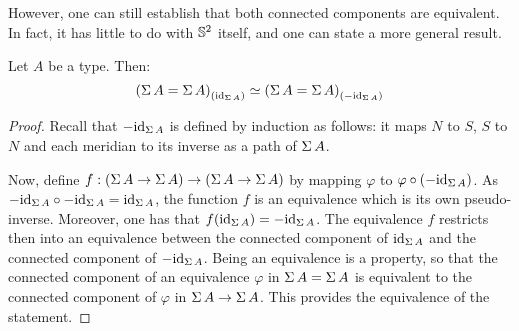 \documentclass[english,a4]{article}
\renewcommand{\ap}[1]{\left[{#1}\right]}
\begin{document}
However, one can still establish that both connected components are equivalent.
In fact, it has little to do with ${{\mathbb S^{2}}}$ itself, and one can state a more
general result.
\begin{proposition} \label{prop:equiv-susp-comp}
  Let $A$ be a type. Then:
  \begin{displaymath}
    {(\operatorname{\Sigma}A = \operatorname{\Sigma}A)}_{\left(\mathord{\mathrm{id}}_{\operatorname{\Sigma} A}\right)} \simeq {(\operatorname{\Sigma}A = \operatorname{\Sigma}A)}_{\left(-\mathord{\mathrm{id}}_{\operatorname{\Sigma} A}\right)}
  \end{displaymath}
  \label{prop:susp-components-are-equiv}
\end{proposition}
\begin{proof}
  Recall that $-\mathord{\mathrm{id}}_{\operatorname{\Sigma} A}$ is defined by induction as follows: it maps $N$
  to $S$, $S$ to $N$ and each meridian to its inverse as a path of $\operatorname{\Sigma} A$.

  Now, define $f:{({\operatorname{\Sigma} A} \to {\operatorname{\Sigma}A})} \to ({\operatorname{\Sigma} A} \to {\operatorname{\Sigma}A})$ by mapping
  $\varphi$ to $\varphi\circ(-\mathord{\mathrm{id}}_{\operatorname{\Sigma} A})$.
  As $-\mathord{\mathrm{id}}_{\operatorname{\Sigma} A}\circ -\mathord{\mathrm{id}}_{\operatorname{\Sigma} A} = \mathord{\mathrm{id}}_{\operatorname{\Sigma} A}$, the function $f$ is
  an equivalence which is its own pseudo-inverse. Moreover, one has that
  $f(\mathord{\mathrm{id}}_{\operatorname{\Sigma} A}) = -\mathord{\mathrm{id}}_{\operatorname{\Sigma} A}$.
  The equivalence $f$ restricts then into an equivalence between the connected
  component of $\mathord{\mathrm{id}}_{\operatorname{\Sigma} A}$ and the connected component of $-\mathord{\mathrm{id}}_{\operatorname{\Sigma} A}$. 
  Being an equivalence is a property, so that the connected component of an
  equivalence $\varphi$ in $\operatorname{\Sigma} A = \operatorname{\Sigma} A$ is equivalent to the connected
  component of $\varphi$ in ${\operatorname{\Sigma} A} \to {\operatorname{\Sigma}A}$. This provides the
  equivalence of the statement.
\end{proof}
\end{document}
